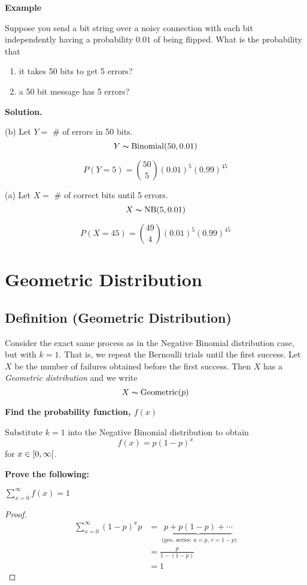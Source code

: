 \textbf{Example}

Suppose you send a bit string over a noisy connection with
each bit independently having a probability $ 0.01 $ of being
flipped. What is the probability that
\begin{enumerate}[label=(\alph*)]
    \item it takes 50 bits to get 5 errors?
    \item a 50 bit message has 5 errors?
\end{enumerate}

\textbf{Solution.}

(b) Let $ Y= $ \# of errors in 50 bits.
\[ Y\thicksim\operatorname{Binomial}(50,0.01) \]

\[ P(Y=5)=\binom{50}{5}(0.01)^5(0.99)^{45} \]

(a) Let $ X= $ \# of correct bits until 5 errors.
\[ X\thicksim\operatorname{NB}(5,0.01) \]

\[ P(X=45)=\binom{49}{4}(0.01)^5(0.99)^{45} \]

\section{Geometric Distribution}

\begin{defbox}
    \subsection{Definition (Geometric Distribution)}
    Consider the exact same process as in the Negative Binomial distribution
    case, but with $ k=1 $. That is, we repeat the Bernoulli trials until
    the first success. Let $ X $ be the number of failures obtained before
    the first success. Then $ X $ has a \emph{Geometric distribution}
    and we write
    \[ X \thicksim \operatorname{Geometric}(p) \]
\end{defbox}

\textbf{Find the probability function, $ f(x)$}

Substitute $ k=1 $ into the Negative Binomial distribution to obtain
\[ f(x)=p(1-p)^x \]
for $ x\in\rinterval{0}{\infty} $.

\textbf{Prove the following:}

$ \sum\limits_{x=0}^{\infty} f(x) = 1$

\begin{proof}
    \begin{align*}
        \sum\limits_{x=0}^{\infty} (1-p)^x p
         & =\underbrace{p+p(1-p)+\cdots}_
        \text{ (geo.\ series: $a=p$, $r=1-p$)} \\
         & =\frac{p}{1-(1-p)}                  \\
         & =1
    \end{align*}
\end{proof}

